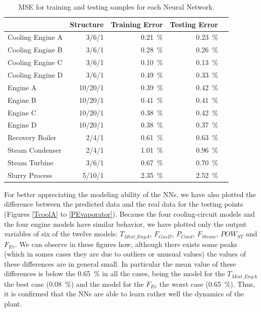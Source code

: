 \begin{table}[!t]
\caption{MSE for training and testing samples for each Neural Network.}
\label{tbl:mse}
  \centering
\begin{tabular}{lrrrr} \toprule
 & Structure  & Training Error & Testing Error \\ \midrule
Cooling Engine A & 3/6/1 & \SI{0.21}{\percent} & \SI{0.23}{\percent} \\
Cooling Engine B & 3/6/1  & \SI{0.28}{\percent} & \SI{0.26}{\percent} \\
Cooling Engine C & 3/6/1  & \SI{0.10}{\percent} & \SI{0.13}{\percent} \\
Cooling Engine D & 3/6/1  & \SI{0.49}{\percent} & \SI{0.33}{\percent} \\
 Engine A & 10/20/1  & \SI{0.39}{\percent} & \SI{0.42}{\percent} \\
 Engine B & 10/20/1  & \SI{0.41}{\percent} & \SI{0.41}{\percent} \\
 Engine C & 10/20/1  & \SI{0.38}{\percent} & \SI{0.42}{\percent} \\
 Engine D & 10/20/1  & \SI{0.38}{\percent} & \SI{0.37}{\percent} \\
 Recovery Boiler & 2/4/1  & \SI{0.61}{\percent} & \SI{0.63}{\percent} \\
 Steam Condenser & 2/4/1  & \SI{1.01}{\percent} & \SI{0.96}{\percent} \\
 Steam Turbine & 3/6/1  & \SI{0.67}{\percent} & \SI{0.70}{\percent} \\
 Slurry Process & 5/10/1  & \SI{2.35}{\percent} & \SI{2.52}{\percent} \\
 \bottomrule
\end{tabular}
\vspace{-0.3cm}

\end{table}

For better appreciating the modeling ability of the NNs, we have also plotted the difference between the predicted data and the real data for the testing points (Figures \ref{TcoolA} to \ref{PEvaporator}). Because the four cooling-circuit models and the four engine models have  similar behavior, we have plotted only the output variables of six of the twelve models: $T_{Mixt\_EngA}$, $F_{GasD}$, $P_{Cond}$, $F_{Steam}$, $POW_{ST}$ and $F_{Ev}$.  We can observe in these figures how, although there exists some peaks (which in somes cases they are due to outliers or unusual values) the values of these differences are in general small. In particular the mean value of these differences is below the \SI{0.65}{\percent} in all the cases, being the model for the $T_{Mixt\_EngA}$ the best case (\SI{0.08}{\percent}) and the model for the $F_{Ev}$ the worst case (\SI{0.65}{\percent}). Thus, it is confirmed that the NNs are able to learn rather well the dynamics of the plant.


